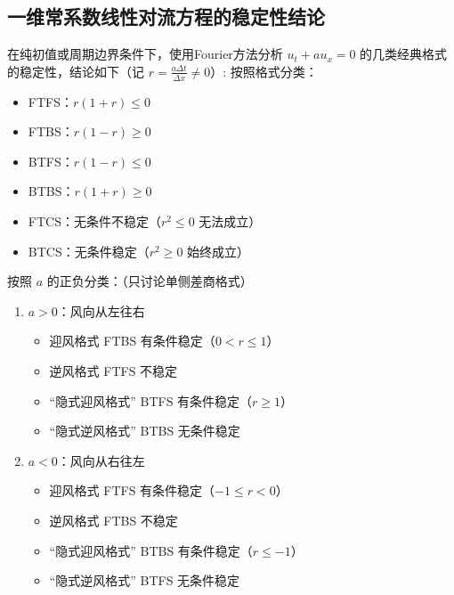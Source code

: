 \subsection*{一维常系数线性对流方程的稳定性结论}

在纯初值或周期边界条件下，使用Fourier方法分析 $u_t+au_x=0$ 的几类经典格式的稳定性，结论如下（记 $r = \frac{a\Delta t}{\Delta x} \neq 0$）:
按照格式分类：
\begin{itemize}
    \item FTFS：$r(1+r) \le 0$
    \item FTBS：$r(1-r) \ge 0$
    \item BTFS：$r(1-r) \le 0$
    \item BTBS：$r(1+r) \ge 0$
    \item FTCS：无条件不稳定（$r^2 \le 0$ 无法成立）
    \item BTCS：无条件稳定（$r^2 \ge 0$ 始终成立）
\end{itemize}
按照 $a$ 的正负分类：（只讨论单侧差商格式）
\begin{enumerate}
    \item $a>0$：风向从左往右
          \begin{itemize}
              \item 迎风格式 FTBS 有条件稳定（$0< r \le 1$）
              \item 逆风格式 FTFS 不稳定
              \item “隐式迎风格式” BTFS 有条件稳定（$r \ge 1$）
              \item “隐式逆风格式” BTBS 无条件稳定
          \end{itemize}
    \item $a<0$：风向从右往左
          \begin{itemize}
              \item 迎风格式 FTFS 有条件稳定（$-1 \le r < 0$）
              \item 逆风格式 FTBS 不稳定
              \item “隐式迎风格式” BTBS 有条件稳定（$r \le -1$）
              \item “隐式逆风格式” BTFS 无条件稳定
          \end{itemize}
\end{enumerate}
